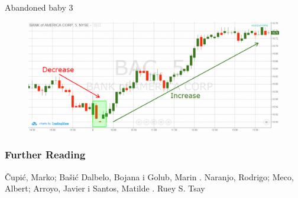 \documentclass{beamer}
\begin{document}
\begin{frame}{Abandoned baby 3}
\begin{figure}[h]
  \includegraphics[width=\textwidth]{img/baby3.png}
\end{figure}
\end{frame}

\begin{frame}
  \frametitle<presentation>{Further Reading}    
  \begin{thebibliography}{10}    
    Čupić, Marko; Bašić Dalbelo, Bojana i Golub, Marin
    .
    Naranjo, Rodrigo; Meco, Albert; Arroyo, Javier i Santos, Matilde
    .
    Ruey S. Tsay
  \end{thebibliography}
\end{frame}
\end{document}
